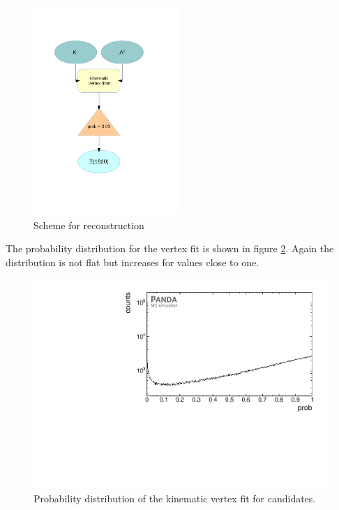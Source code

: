 		\begin{figure}
			\centering
				\includegraphics[width=0.50\textwidth]{./plots/combineExcitedCascade.pdf}
			\caption{\propose Scheme for \excitedcascade reconstruction}
			\label{fig:excitedcascade_scheme}
		\end{figure}
		
		
		The probability distribution for the vertex fit is shown in figure \ref{fig:xi1820_prob}.
		Again the distribution is not flat but increases for values close to one. 
		
		\begin{figure}
			\centering
			\includegraphics[width=1.\textwidth]{./plots/Xi1820/XiMinus1820_prob.pdf}
			\caption{Probability distribution of the kinematic vertex fit for \excitedcascade candidates.}
			\label{fig:xi1820_prob}
		\end{figure}
		
